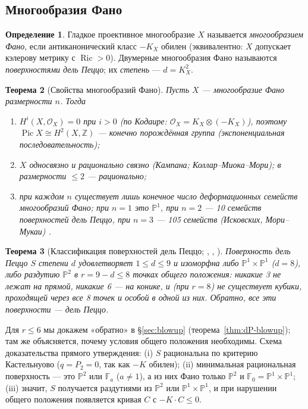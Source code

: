 \documentclass[11pt,a4paper]{article}
\theoremstyle{plain}
\newtheorem{theorem}{Теорема}[section]
\theoremstyle{definition}
\newtheorem{definition}[theorem]{Определение}
\theoremstyle{remark}
\newcommand{\Z}{\mathbb{Z}}
\newcommand{\PP}{\mathbb{P}}
\newcommand{\cO}{\mathcal{O}}
\DeclareMathOperator{\Pic}{Pic}
\DeclareMathOperator{\Ric}{Ric}
\begin{document}
\subsection{Многообразия Фано}

\begin{definition}
Гладкое проективное многообразие $X$ называется \emph{многообразием Фано}, если антиканонический класс
$-K_X$ обилен (эквивалентно: $X$ допускает кэлерову метрику с $\Ric>0$). Двумерные многообразия Фано
называются \emph{поверхностями дель Пеццо}; их \emph{степень} --- $d=K_X^2$.
\end{definition}

\begin{theorem}[Свойства многообразий Фано]
Пусть $X$ --- многообразие Фано размерности $n$. Тогда
\begin{enumerate}
\item $H^i(X,\cO_X)=0$ при $i>0$ (по Кодаире: $\cO_X=K_X\otimes(-K_X)$), поэтому
$\Pic X\cong H^2(X,\Z)$ --- конечно порождённая группа (экспоненциальная последовательность);
\item $X$ односвязно и рационально связно (Кампана; Коллар--Миока--Мори); в размерности $\le2$ ---
рационально;
\item при каждом $n$ существует лишь конечное число деформационных семейств многообразий Фано;
при $n=1$ это $\PP^1$, при $n=2$ --- 10 семейств поверхностей дель Пеццо, при $n=3$ --- 105 семейств
(Исковских, Мори--Мукаи) \cite{IP}.
\end{enumerate}
\end{theorem}

\begin{theorem}[{Классификация поверхностей дель Пеццо; \cite[IV]{Ma}, \cite{De}, \cite[8]{Do}}]\label{thm:dP}
Поверхность дель Пеццо $S$ степени $d$ удовлетворяет $1\le d\le9$ и изоморфна либо
$\PP^1\times\PP^1$ ($d=8$), либо раздутию $\PP^2$ в $r=9-d\le8$ точках \emph{общего положения}:
никакие 3 не лежат на прямой, никакие 6 --- на конике, и (при $r=8$) не существует кубики, проходящей через
все 8 точек и особой в одной из них. Обратно, все эти поверхности --- дель Пеццо.
\end{theorem}

Для $r\le6$ мы докажем «обратно» в \S\ref{sec:blowup} (теорема~\ref{thm:dP-blowup}); там же объясняется,
почему условия общего положения необходимы. Схема доказательства прямого утверждения: (i) $S$ рациональна
по критерию Кастельнуово ($q=P_2=0$, так как $-K$ обилен); (ii) минимальная рациональная поверхность ---
это $\PP^2$ или $\mathbb F_a$ ($a\ne1$), а из них Фано только $\PP^2$ и $\mathbb F_0=\PP^1\times\PP^1$;
(iii) значит, $S$ получается раздутиями из $\PP^2$ или $\PP^1\times\PP^1$, и при нарушении общего положения
появляется кривая $C$ с $-K\cdot C\le0$.
\end{document}
